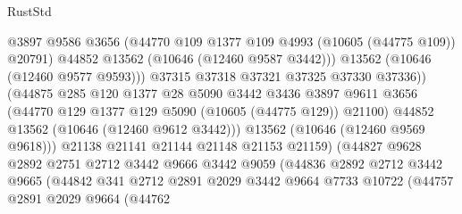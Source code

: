 \begin{lexlean}{RustStd}
\begin{coremodule}
                                    @3897
                                    @9586
                                    @3656
                                    (@44770 @109 @1377 @109 @4993 (@10605 (@44775 @109)) @20791)
                                    @44852
                                    @13562
                                    (@10646 (@12460 @9587 @3442)))
                                  @13562
                                  (@10646 (@12460 @9577 @9593)))
                                @37315
                                @37318
                                @37321
                                @37325
                                @37330
                                @37336))
                            (@44875
                              @285
                              @120
                              @1377
                              @28
                              @5090
                              @3442
                              @3436
                              @3897
                              @9611
                              @3656
                              (@44770 @129 @1377 @129 @5090 (@10605 (@44775 @129)) @21100)
                              @44852
                              @13562
                              (@10646 (@12460 @9612 @3442)))
                            @13562
                            (@10646 (@12460 @9569 @9618)))
                          @21138
                          @21141
                          @21144
                          @21148
                          @21153
                          @21159)
                        (@44827
                          @9628
                          @2892
                          @2751
                          @2712
                          @3442
                          @9666
                          @3442
                          @9059
                          (@44836
                            @2892
                            @2712
                            @3442
                            @9665
                            (@44842
                              @341
                              @2712
                              @2891
                              @2029
                              @3442
                              @9664
                              @7733
                              @10722
                              (@44757
                                @2891
                                @2029
                                @9664
                                (@44762

\end{coremodule}
\end{lexlean}
